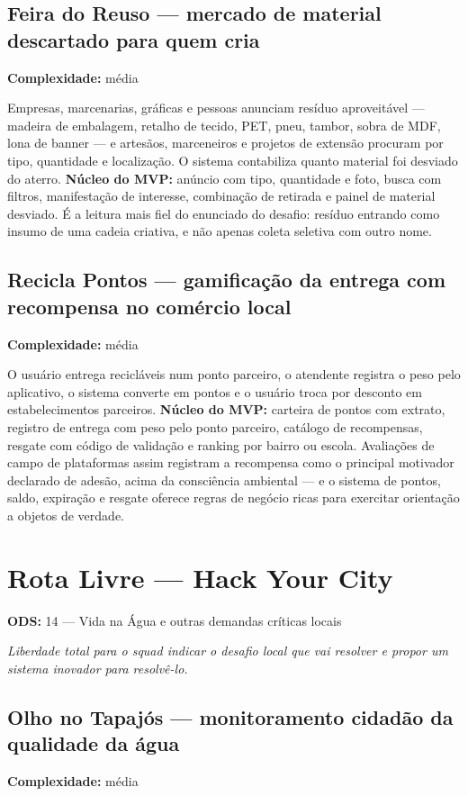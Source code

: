 \documentclass[11pt,a4paper]{article}
\newcommand{\complex}[1]{{\small\color{cinza}\textbf{Complexidade:} #1}}
\newcommand{\ods}[1]{{\small\color{verde}\textbf{ODS:} #1}}
\begin{document}
\subsection{Feira do Reuso --- mercado de material descartado para quem cria}
\complex{média}

Empresas, marcenarias, gráficas e pessoas anunciam resíduo aproveitável --- madeira de embalagem,
retalho de tecido, PET, pneu, tambor, sobra de MDF, lona de banner --- e artesãos, marceneiros e
projetos de extensão procuram por tipo, quantidade e localização. O sistema contabiliza quanto
material foi desviado do aterro. \textbf{Núcleo do MVP:} anúncio com tipo, quantidade e foto, busca
com filtros, manifestação de interesse, combinação de retirada e painel de material desviado. É a
leitura mais fiel do enunciado do desafio: resíduo entrando como insumo de uma cadeia criativa, e
não apenas coleta seletiva com outro nome.

\subsection{Recicla Pontos --- gamificação da entrega com recompensa no comércio local}
\complex{média}

O usuário entrega recicláveis num ponto parceiro, o atendente registra o peso pelo aplicativo, o
sistema converte em pontos e o usuário troca por desconto em estabelecimentos parceiros.
\textbf{Núcleo do MVP:} carteira de pontos com extrato, registro de entrega com peso pelo ponto
parceiro, catálogo de recompensas, resgate com código de validação e ranking por bairro ou escola.
Avaliações de campo de plataformas assim registram a recompensa como o principal motivador declarado
de adesão, acima da consciência ambiental --- e o sistema de pontos, saldo, expiração e resgate
oferece regras de negócio ricas para exercitar orientação a objetos de verdade.

\newpage

\section{Rota Livre --- Hack Your City}
\ods{14 --- Vida na Água \quad e outras demandas críticas locais}

\emph{Liberdade total para o squad indicar o desafio local que vai resolver e propor um sistema
inovador para resolvê-lo.}

\subsection{Olho no Tapajós --- monitoramento cidadão da qualidade da água}
\complex{média}
\end{document}
